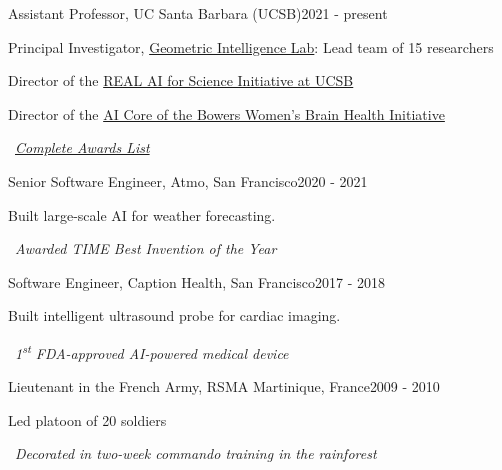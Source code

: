 
\begin{joblong}{Assistant Professor, UC Santa Barbara (UCSB)}{2021 - present}
\item Principal Investigator, \href{https://gi.ece.ucsb.edu/}{Geometric Intelligence Lab}: Lead team of 15 researchers
\item Director of the \href{https://www.ai.ece.ucsb.edu/}{REAL AI for Science Initiative at UCSB}
\item Director of the \href{https://wbhi.ucsb.edu/}{AI Core of the Bowers Women's Brain Health Initiative}
\item {\small{\faAward}}~\href{https://www.ninamiolane.com/pagecv}{\textit{Complete Awards List}}
\end{joblong}

\begin{joblong}{Senior Software Engineer, Atmo, San Francisco}{2020 - 2021}
\item Built large-scale AI for weather forecasting. 
\item {\small{\faAward}}~\textit{Awarded TIME Best Invention of the Year}
\end{joblong}

\begin{joblong}{Software Engineer, Caption Health, San Francisco}{2017 - 2018}
\item Built  intelligent ultrasound probe for cardiac imaging. 
\item {\small{\faAward}}~\textit{1\textsuperscript{st} FDA-approved AI-powered medical device}
\end{joblong}

\begin{joblong}{Lieutenant in the French Army, RSMA Martinique, France}{2009 - 2010}
\item Led platoon of 20 soldiers
\item {\small{\faAward}}~\textit{Decorated in two-week commando training in the rainforest}
\end{joblong}
